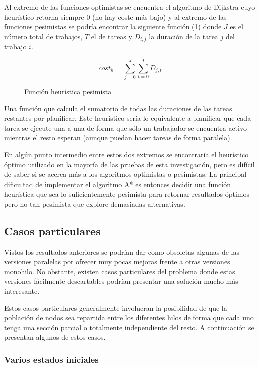 Al extremo de las funciones optimistas
se encuentra el algoritmo de Dijkstra
cuyo heurístico retorna siempre 0
(no hay coste más bajo) y
al extremo de las funciones pesimistas se podría encontrar la siguiente
función (\ref{eq:HeuristicoPesimista})
donde $J$ es el número total de trabajos, $T$ el de tareas y $D_{i,j}$
la duración de la tarea $j$ del trabajo $i$.

\begin{figure}[h]
    $$
    cost_h = \sum_{j=0}^{J}{
        \sum_{t=0}^{T}{
            D_{j,t}
        }
    }
    $$
    \caption{Función heurística pesimista}
    \label{eq:HeuristicoPesimista}
\end{figure}

Una función que calcula el sumatorio de todas las duraciones
de las tareas restantes por planificar.
Este heurístico sería lo equivalente a planificar
que cada tarea se ejecute una a una de forma
que sólo un trabajador se encuentra activo mientras
el resto esperan (aunque puedan hacer tareas de forma paralela).

En algún punto intermedio entre estos dos extremos
se encontraría el heurístico óptimo utilizado
en la mayoría de las pruebas de esta investigación,
pero es difícil de saber si se acerca más
a los algoritmos optimistas o pesimistas.
La principal dificultad de implementar el algoritmo A*
es entonces decidir una función heurística
que sea lo suficientemente pesimista para retornar resultados óptimos
pero no tan pesimista que explore demasiadas alternativas.

\pagebreak

\subsection{Casos particulares}

Vistos los resultados anteriores
se podrían dar como obsoletas algunas de las versiones
paralelas por ofrecer muy pocas mejoras frente a otras
versiones monohilo.
No obstante, existen casos particulares del problema
donde estas versiones fácilmente descartables
podrían presentar una solución mucho más interesante.

Estos casos particulares generalmente involucran
la posibilidad de que la población de nodos sea
repartida entre los diferentes hilos de forma
que cada uno tenga una sección parcial o totalmente
independiente del resto.
A continuación se presentan algunos de estos casos.

\subsubsection{Varios estados iniciales}

